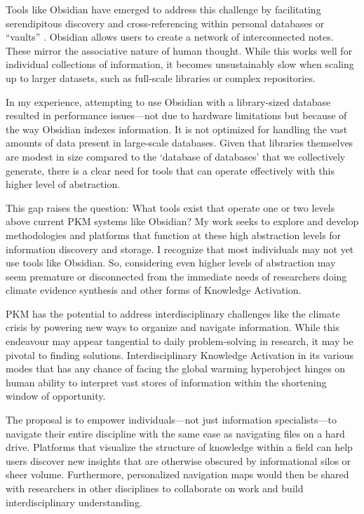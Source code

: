 Tools like Obsidian \citep{li_about_2024} have emerged to address this challenge by facilitating serendipitous discovery and cross-referencing within personal databases or “vaults” \citep{obsidian_create_nodate}. Obsidian allows users to create a network of interconnected notes. These mirror the associative nature of human thought. While this works well for individual collections of information, it becomes unsustainably slow when scaling up to larger datasets, such as full-scale libraries or complex repositories.

In my experience, attempting to use Obsidian with a library-sized database resulted in performance issues—not due to hardware limitations but because of the way Obsidian indexes information. It is not optimized for handling the vast amounts of data present in large-scale databases. Given that libraries themselves are modest in size compared to the ‘database of databases’ that we collectively generate, there is a clear need for tools that can operate effectively with this higher level of abstraction.

This gap raises the question: What tools exist that operate one or two levels above current PKM systems like Obsidian? My work seeks to explore and develop methodologies and platforms that function at these high abstraction levels for information discovery and storage. I recognize that most individuals may not yet use tools like Obsidian. So, considering even higher levels of abstraction may seem premature or disconnected from the immediate needs of researchers doing climate evidence synthesis and other forms of Knowledge Activation.

PKM has the potential to address interdisciplinary challenges like the climate crisis by powering new ways to organize and navigate information. While this endeavour may appear tangential to daily problem-solving in research, it may be pivotal to finding solutions. Interdisciplinary Knowledge Activation in its various modes that has any chance of facing the global warming hyperobject hinges on human ability to interpret vast stores of information within the shortening window of opportunity. 

The proposal is to empower individuals—not just information specialists—to navigate their entire discipline with the same ease as navigating files on a hard drive. Platforms that visualize the structure of knowledge within a field can help users discover new insights that are otherwise obscured by informational silos or sheer volume. Furthermore, personalized navigation maps would then be shared with researchers in other disciplines to collaborate on work and build interdisciplinary understanding.


